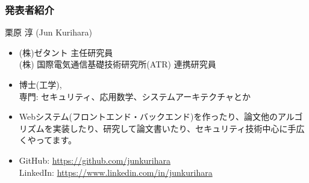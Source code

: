 \begin{frame}
\frametitle{発表者紹介}
{\Large 栗原 淳 (Jun Kurihara)}
\begin{itemize}
 \item (株)ゼタント 主任研究員\\
(株) 国際電気通信基礎技術研究所(ATR) 連携研究員
 \item 博士(工学), \\
 専門: セキュリティ、応用数学、システムアーキテクチャとか
 \item  Webシステム(フロントエンド・バックエンド)を作ったり、論文他のアルゴリズムを実装したり、研究して論文書いたり、セキュリティ技術中心に手広くやってます。
 \item GitHub: \url{https://github.com/junkurihara}\\
LinkedIn: \url{https://www.linkedin.com/in/junkurihara}
\end{itemize}
\end{frame}
